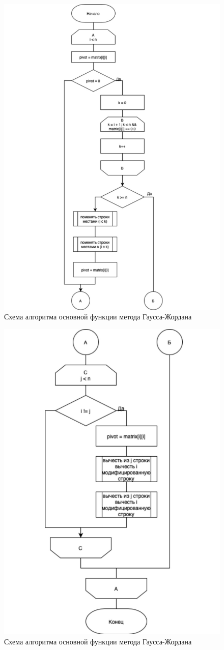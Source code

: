 \begin{figure}[h]
    \centering
    \includegraphics[width=0.9\linewidth]{img/gauss1.pdf}
    \caption{Схема алгоритма основной функции метода Гаусса-Жордана}
    \label{fig:gauss1}
\end{figure}

\begin{figure}[h]
    \centering
    \includegraphics[width=0.7\linewidth]{img/gauss2.pdf}
    \caption{Схема алгоритма основной функции метода Гаусса-Жордана}
    \label{fig:gauss2}
\end{figure}

